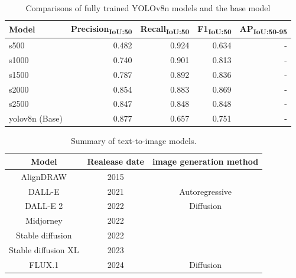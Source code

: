 
\begin{table}[ht]
    \begin{tabular}{|l|r|r|r|r|}
    \hline
    Model & Precision\textsubscript{IoU:50} & Recall\textsubscript{IoU:50} & F1\textsubscript{IoU:50} & AP\textsubscript{IoU:50-95} \\
    \hline
    s500 & 0.482 & 0.924 & 0.634 & -\\
    s1000 & 0.740 & 0.901 & 0.813 & - \\
    s1500 & 0.787 & 0.892 & 0.836 & - \\
    s2000 & 0.854 & 0.883 & 0.869 & - \\
    s2500 & 0.847 & 0.848 & 0.848 & - \\
    \hline
    \hline
    yolov8n (Base) & 0.877 & 0.657 & 0.751 & - \\
    \hline
    \end{tabular}
    \caption{Comparisons of fully trained YOLOv8n models and the base model} 
    \label{tab:results}
    \end{table}


    \begin{table}[!h]
    \centering
    \begin{tabular}{|c|c|c|}
    \hline
    Model & Realease date & image generation method \\ \hline
    AlignDRAW & 2015 & \\ \hline
    DALL-E & 2021 & Autoregressive \\ \hline
    DALL-E 2 & 2022 & Diffusion \\ \hline
    Midjorney & 2022 &  \\ \hline
    Stable diffusion& 2022 & \\ \hline
    Stable diffusion XL & 2023 & \\ \hline
    FLUX.1 & 2024 & Diffusion \\ \hline



    \end{tabular}
    \caption{Summary of text-to-image models.}
    \label{tab:models}
    \end{table}


